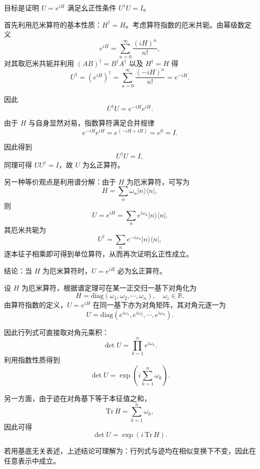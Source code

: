\begin{solution}[算符指数的幺正性]

\answer
目标是证明 $U=e^{iH}$ 满足幺正性条件 $U^\dagger U=I$。

首先利用厄米算符的基本性质：$H^\dagger=H$。考虑算符指数的厄米共轭。由幂级数定义
\[
e^{iH}=\sum_{n=0}^\infty \frac{(iH)^n}{n!},
\]
对其取厄米共轭并利用 $(AB)^\dagger=B^\dagger A^\dagger$ 以及 $H^\dagger=H$ 得
\[
U^\dagger=(e^{iH})^\dagger=\sum_{n=0}^\infty \frac{(-iH)^n}{n!}=e^{-iH}.
\]

因此
\[
U^\dagger U = e^{-iH}e^{iH}.
\]

由于 $H$ 与自身显然对易，指数算符满足合并规律
\[
e^{-iH}e^{iH}=e^{(-iH+iH)}=e^0=I.
\]

因此得到
\[
U^\dagger U=I,
\]
同理可得 $UU^\dagger=I$，故 $U$ 为幺正算符。

另一种等价观点是利用谱分解：由于 $H$ 为厄米算符，可写为
\[
H=\sum_n \omega_n |n\rangle\langle n|,
\]
则
\[
U=e^{iH}=\sum_n e^{i\omega_n}|n\rangle\langle n|.
\]
其厄米共轭为
\[
U^\dagger=\sum_n e^{-i\omega_n}|n\rangle\langle n|,
\]
逐本征子相乘即可得到单位算符，从而再次证明幺正性成立。

结论：当 $H$ 为厄米算符时，$U=e^{iH}$ 必为幺正算符。
\end{solution}


\begin{solution}[行列式与算符函数]

\answer
设 $H$ 为厄米算符，根据谱定理可在某一正交归一基下对角化为
\[
H=\mathrm{diag}(\omega_1,\omega_2,\cdots,\omega_n),\quad \omega_i\in\mathbb{R}.
\]
由算符指数的定义，$U=e^{iH}$ 在同一基下亦为对角矩阵，其对角元逐一为
\[
U=\mathrm{diag}\left(e^{i\omega_1},e^{i\omega_2},\cdots,e^{i\omega_n}\right).
\]

因此行列式可直接取对角元乘积：
\[
\det U=\prod_{k=1}^n e^{i\omega_k}.
\]
利用指数性质得到
\[
\det U=\exp\left(i\sum_{k=1}^n \omega_k\right).
\]

另一方面，由于迹在对角基下等于本征值之和，
\[
\mathrm{Tr}\,H=\sum_{k=1}^n \omega_k,
\]
因此可得
\[
\det U=\exp\left(i\,\mathrm{Tr}\,H\right).
\]

若用基底无关表述，上述结论可理解为：行列式与迹均在相似变换下不变，因此在任意表示中成立。
\end{solution}